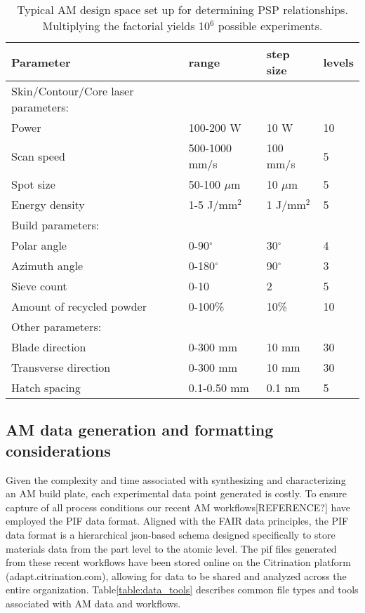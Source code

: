 \begin{table*}
    \renewcommand{\arraystretch}{0.8}
    \setlength{\tabcolsep}{5pt}
    \begin{center}
        \begin{tabular}{@{}llll@{}}
            \toprule
            \hline
             Parameter & range & step size & levels \\ \midrule
            \hline
            \hline
            Skin/Contour/Core laser parameters: & & & \\
            Power & 100-200 W & 10 W & 10 \\
            Scan speed & 500-1000 mm/s & 100 mm/s & 5 \\
            Spot size & 50-100 $\mu$m & 10 $\mu$m & 5 \\
            Energy density & 1-5 J/mm$^2$ & 1 J/mm$^2$ & 5 \\
            \hline
            Build parameters: & & & \\
            Polar angle & 0-90$^\circ$ & 30$^\circ$  & 4 \\
            Azimuth angle & 0-180$^\circ$ & 90$^\circ$  & 3 \\
            Sieve count & 0-10 & 2 & 5 \\
            Amount of recycled powder & 0-100\% & 10\% & 10 \\
            \hline
            Other parameters: & & & \\
            Blade direction & 0-300 mm & 10 mm  & 30 \\
            Transverse direction & 0-300 mm & 10 mm  & 30 \\
            Hatch spacing & 0.1-0.50 mm & 0.1 nm  & 5 \\
            \hline
            \bottomrule
        \end{tabular}
        \caption{Typical AM design space set up for determining PSP relationships. Multiplying the factorial yields 10$^6$ possible experiments.}
        \label{table:design_space}
    \end{center}
\end{table*}

\subsection{AM data generation and formatting considerations}
\label{subsec:DMC_data}
Given the complexity and time associated with synthesizing and characterizing an AM build plate, each experimental data point generated is costly.
To ensure capture of all process conditions our recent AM workflows[REFERENCE?] have employed the PIF data format.
Aligned with the FAIR data principles\cite{Wilkinson2016}, the PIF data format is a hierarchical json-based schema designed specifically to store materials data from the part level to the atomic level.
The pif files generated from these recent workflows have been stored online on the Citrination platform (adapt.citrination.com), allowing for data to be shared and analyzed across the entire organization.
Table\ref{table:data_tools} describes common file types and tools associated with AM data and workflows.

